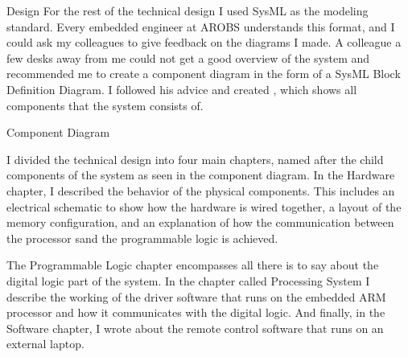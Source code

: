 \documentclass{matthijs}
\begin{document}
\begin{hoofdstuk}{Design}
		For the rest of the technical design I used SysML \cite{hause2006sysml} as the modeling standard.
		Every embedded engineer at AROBS understands this format, and I could ask my colleagues to give feedback on the diagrams I made.
		A colleague a few desks away from me could not get a good overview of the system and recommended me to create a component diagram in the form of a SysML Block Definition Diagram.
		I followed his advice and created , which shows all components that the system consists of.

		\begin{figuur}{Component Diagram}
			\singlespacing
			\centerline{
			}
			\vspace{1.5ex}
			\onehalfspacing
		\end{figuur}

		\noindent I divided the technical design into four main chapters, named after the child components of the system as seen in the component diagram.
		In the Hardware chapter, I described the behavior of the physical components.
		This includes an electrical schematic to show how the hardware is wired together, a layout of the memory configuration, and an explanation of how the communication between the processor sand the programmable logic is achieved.
		
		The Programmable Logic chapter encompasses all there is to say about the digital logic part of the system.
		In the chapter called Processing System I describe the working of the driver software that runs on the embedded ARM processor and how it communicates with the digital logic.
		And finally, in the Software chapter, I wrote about the remote control software that runs on an external laptop.


	\end{hoofdstuk}
	
\end{document}
